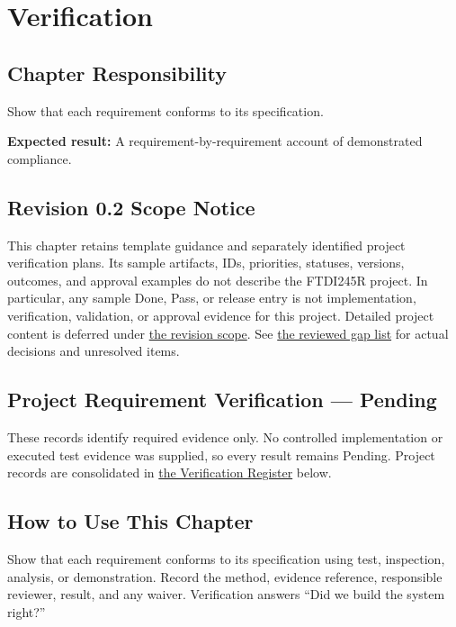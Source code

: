 \chapter{Verification}
\section{Chapter Responsibility}
\label{Section:VerificationResponsibility}
Show that each requirement conforms to its specification.

\noindent\textbf{Expected result:} A requirement-by-requirement account of demonstrated compliance.

\section{Revision 0.2 Scope Notice}
\label{Section:DeferredVerification}
\begin{fsaNote}
This chapter retains template guidance and separately identified project verification plans.
Its sample artifacts, IDs, priorities, statuses, versions, outcomes, and
approval examples do not describe the FTDI245R project. In particular, any
sample Done, Pass, or release entry is not implementation, verification,
validation, or approval evidence for this project. Detailed project content
is deferred under \hyperref[Section:ProjectScope]{the revision scope}.
See \hyperref[Table:ProjectGapReview]{the reviewed gap list} for actual
decisions and unresolved items.
\end{fsaNote}

\section{Project Requirement Verification --- Pending}
\label{Section:ProjectRequirementVerification}
These records identify required evidence only. No controlled implementation
or executed test evidence was supplied, so every result remains Pending.
\small
Project records are consolidated in \hyperref[Table:VerificationRegister]{the Verification Register} below.
\normalsize

\section{How to Use This Chapter}
Show that each requirement conforms to its specification using test, inspection, analysis, or demonstration. Record the method, evidence reference, responsible reviewer, result, and any waiver.
Verification answers ``Did we build the system right?''

